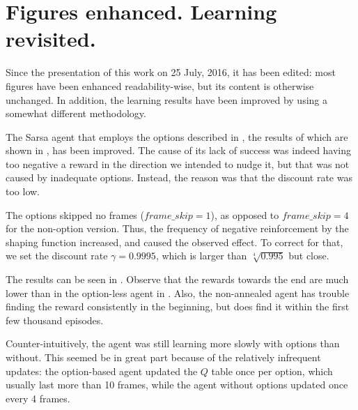 \chapter{Figures enhanced. Learning revisited.}
Since the presentation of this work on 25 July, 2016, it has been
edited: most figures have been enhanced readability-wise, but its content is
otherwise unchanged. In addition, the learning results have been improved by
using a somewhat different methodology.

The Sarsa agent that employs the options described in , the
results of which are shown in , has been improved. The
cause of its lack of success was indeed having too negative a reward in the
direction we intended to nudge it, but that was not caused by inadequate
options. Instead, the reason was that the discount rate was too low.

The options skipped no frames ($frame\_skip=1$), as opposed to $frame\_skip=4$
for the non-option version. Thus, the frequency of negative reinforcement by the
shaping function increased, and caused the observed effect. To correct for that,
we set the discount rate $\gamma=0.9995$, which is larger than $\sqrt[4]{0.995}$
but close.

The results can be seen in . Observe that the
rewards towards the end are much lower than in the option-less agent in
. Also, the non-annealed agent has trouble finding
the reward consistently in the beginning, but does find it within the first few
thousand episodes.


Counter-intuitively, the agent was still learning more
slowly with options than without. This seemed be in great part because of
the relatively infrequent updates: the option-based agent updated the $Q$ table
once per option, which usually last more than 10 frames, while the agent without
options updated once every 4 frames.

